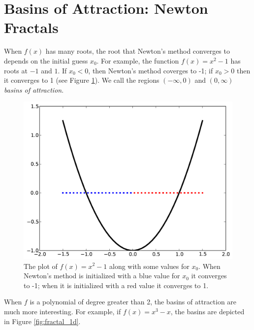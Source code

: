 \section*{Basins of Attraction: Newton Fractals}
When $f(x)$ has many roots, the root that Newton's method converges to depends on the initial guess $x_0$.
For example, the function $f(x)=x^2-1$ has roots at $-1$ and $1$.
If $x_0<0$, then Newton's method coverges to -1; if $x_0>0$ then it converges to 1 (see Figure \ref{fig:basins1}).
We call the regions $(-\infty, 0)$ and $(0, \infty)$ \emph{basins of attraction}.

\begin{figure}
\begin{center}
\includegraphics[scale=0.5]{basins1}
\caption{The plot of $f(x) = x^2 -1$ along with some values for $x_0$.
When Newton's method is initialized with a blue value for $x_0$ it converges to -1; when it is initialized with a red value it converges to 1.}
\label{fig:basins1}
\end{center}
\end{figure}

When $f$ is a polynomial of degree greater than 2, the basins of attraction are much more interesting.
For example, if $f(x) = x^3-x$, the basins are depicted in Figure \ref{fig:fractal_1d}.

